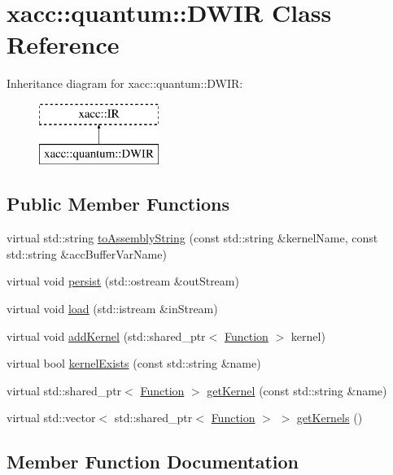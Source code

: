 \hypertarget{a00979}{}\section{xacc\+:\+:quantum\+:\+:D\+W\+IR Class Reference}
\label{a00979}
Inheritance diagram for xacc\+:\+:quantum\+:\+:D\+W\+IR\+:\begin{figure}[H]
\begin{center}
\leavevmode
\includegraphics[height=2.000000cm]{a00979}
\end{center}
\end{figure}
\subsection*{Public Member Functions}
\begin{DoxyCompactItemize}
\item 
virtual std\+::string \hyperlink{a00979_a880cb60197577ea31115331e3a030e3e}{to\+Assembly\+String} (const std\+::string \&kernel\+Name, const std\+::string \&acc\+Buffer\+Var\+Name)
\item 
virtual void \hyperlink{a00979_abcbfd0a4cf697843391c65cbd9a82080}{persist} (std\+::ostream \&out\+Stream)
\item 
virtual void \hyperlink{a00979_a8b388d719d565bb902c979807d3d0d47}{load} (std\+::istream \&in\+Stream)
\item 
virtual void \hyperlink{a00979_af1bef18e1e9568d1313b03149aab8c1b}{add\+Kernel} (std\+::shared\+\_\+ptr$<$ \hyperlink{a01151}{Function} $>$ kernel)
\item 
virtual bool \hyperlink{a00979_ab5e8861d3bc0845bb015af6208f5f396}{kernel\+Exists} (const std\+::string \&name)
\item 
virtual std\+::shared\+\_\+ptr$<$ \hyperlink{a01151}{Function} $>$ \hyperlink{a00979_a38d8bdd24250749bc38ad31f8512fcfc}{get\+Kernel} (const std\+::string \&name)
\item 
virtual std\+::vector$<$ std\+::shared\+\_\+ptr$<$ \hyperlink{a01151}{Function} $>$ $>$ \hyperlink{a00979_a66e22c5dc95ec46045476864012ad08f}{get\+Kernels} ()
\end{DoxyCompactItemize}


\subsection{Member Function Documentation}
\mbox{\label{a00979_af1bef18e1e9568d1313b03149aab8c1b}} 
